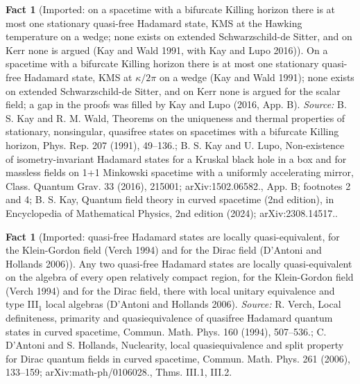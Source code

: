 \documentclass[11pt]{article}
\theoremstyle{definition}
\newtheorem{fact}[theorem]{Fact}
\theoremstyle{plain}
\begin{document}
\begin{fact}[Imported: on a spacetime with a bifurcate Killing horizon there is at most one stationary quasi-free Hadamard state, KMS at the Hawking temperature on a wedge; none exists on extended Schwarzschild-de Sitter, and on Kerr none is argued (Kay and Wald 1991, with Kay and Lupo 2016)]\label{c:synthesis.imported-kay-wald-uniqueness-and-no-go}
On a spacetime with a bifurcate Killing horizon there is at most one stationary quasi-free Hadamard state, KMS at $\kappa/2\pi$ on a wedge (Kay and Wald 1991); none exists on extended Schwarzschild-de Sitter, and on Kerr none is argued for the scalar field; a gap in the proofs was filled by Kay and Lupo (2016, App. B).
\emph{Source:} B. S. Kay and R. M. Wald, Theorems on the uniqueness and thermal properties of stationary, nonsingular, quasifree states on spacetimes with a bifurcate Killing horizon, Phys. Rep. 207 (1991), 49--136.; B. S. Kay and U. Lupo, Non-existence of isometry-invariant Hadamard states for a Kruskal black hole in a box and for massless fields on 1+1 Minkowski spacetime with a uniformly accelerating mirror, Class. Quantum Grav. 33 (2016), 215001; arXiv:1502.06582., App. B; footnotes 2 and 4; B. S. Kay, Quantum field theory in curved spacetime (2nd edition), in Encyclopedia of Mathematical Physics, 2nd edition (2024); arXiv:2308.14517..
\end{fact}

\begin{fact}[Imported: quasi-free Hadamard states are locally quasi-equivalent, for the Klein-Gordon field (Verch 1994) and for the Dirac field (D'Antoni and Hollands 2006)]\label{c:synthesis.imported-local-quasi-equivalence-of-hadamard-states}
Any two quasi-free Hadamard states are locally quasi-equivalent on the algebra of every open relatively compact region, for the Klein-Gordon field (Verch 1994) and for the Dirac field, there with local unitary equivalence and type III$_{1}$ local algebras (D'Antoni and Hollands 2006).
\emph{Source:} R. Verch, Local definiteness, primarity and quasiequivalence of quasifree Hadamard quantum states in curved spacetime, Commun. Math. Phys. 160 (1994), 507--536.; C. D'Antoni and S. Hollands, Nuclearity, local quasiequivalence and split property for Dirac quantum fields in curved spacetime, Commun. Math. Phys. 261 (2006), 133--159; arXiv:math-ph/0106028., Thms. III.1, III.2.
\end{fact}
\end{document}
